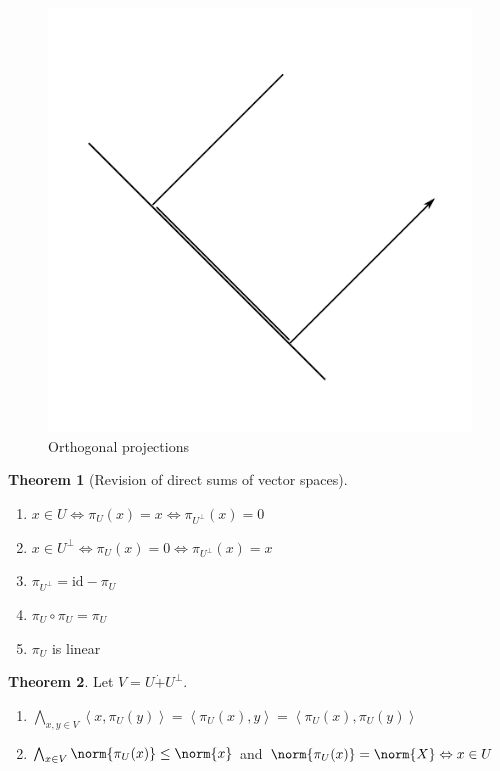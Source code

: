 \documentclass[a4paper,landscape,twocolumn]{article}
\newcommand\functional[1]{\left\langle{#1}\right\rangle}
\theoremstyle{definition}
\newtheorem{theorem}{Theorem}
\DeclarePairedDelimiter\norm\lVert\rVert
\begin{document}
\begin{figure}[!h]
  \begin{center}
    \includegraphics{img/orthogonal_projections.pdf}
    \caption{Orthogonal projections}
    \label{img:orth-proj}
  \end{center}
\end{figure}

\begin{theorem}[Revision of direct sums of vector spaces]
  \label{wh-8.49}
  \begin{enumerate}
    \item $x \in U \Leftrightarrow \pi_U(x) = x \Leftrightarrow \pi_{U^{\bot}}(x) = 0$
    \item $x \in U^{\bot} \Leftrightarrow \pi_U(x) = 0 \Leftrightarrow \pi_{U^{\bot}}(x) = x$
    \item $\pi_{U^{\bot}} = \text{id} - \pi_U$
    \item $\pi_U \circ \pi_U = \pi_U$
    \item $\pi_U$ is linear
  \end{enumerate}
\end{theorem}

\begin{theorem}
  \label{satz-8.50}
  Let $V = U \dot{+} U^{\bot}$.
  \begin{enumerate}
    \item $\bigwedge_{x,y \in V} \functional{x, \pi_U(y)} = \functional{\pi_U(x), y} = \functional{\pi_U(x), \pi_U(y)}$
    \item $\bigwedge_{x \in V} \norm{\pi_U(x)} \leq \norm{x}$
      and $\norm{\pi_U(x)} = \norm{X} \Leftrightarrow x \in U$
  \end{enumerate}
\end{theorem}
\end{document}

